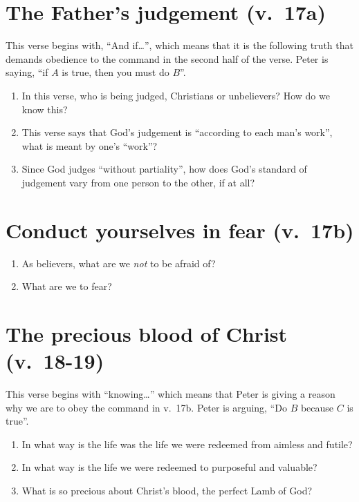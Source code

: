 \documentclass[12pt]{article}
\begin{document}
\section{The Father's judgement (v.~17a)}
This verse begins with, ``And if\ldots'',
    which means that it is the following truth that
    demands obedience to the command in the second half of the verse.
Peter is saying, ``if $A$ is true, then you must do $B$''.
\begin{enumerate}
\item In this verse, who is being judged, Christians or unbelievers? 
    How do we know this?
\item This verse says that God's judgement is ``according to each man's work'',
    what is meant by one's ``work''?
\item Since God judges ``without partiality'', 
    how does God's standard of judgement vary from one person to the other, 
    if at all?
\end{enumerate}

\section{Conduct yourselves in fear (v.~17b)}
\begin{enumerate}
\item As believers, what are we \emph{not} to be afraid of?
\item What are we to fear?
\end{enumerate}

\section{The precious blood of Christ (v.~18-19)}
This verse begins with ``knowing\ldots'' which means
    that Peter is giving a reason why we are to obey the command in v.~17b.
Peter is arguing, ``Do $B$ because $C$ is true''.
\begin{enumerate}
\item In what way is the life was the life we were redeemed from 
    aimless and futile?
\item In what way is the life we were redeemed to purposeful and valuable?
\item What is so precious about Christ's blood, the perfect Lamb of God?
\end{enumerate}
\end{document}
